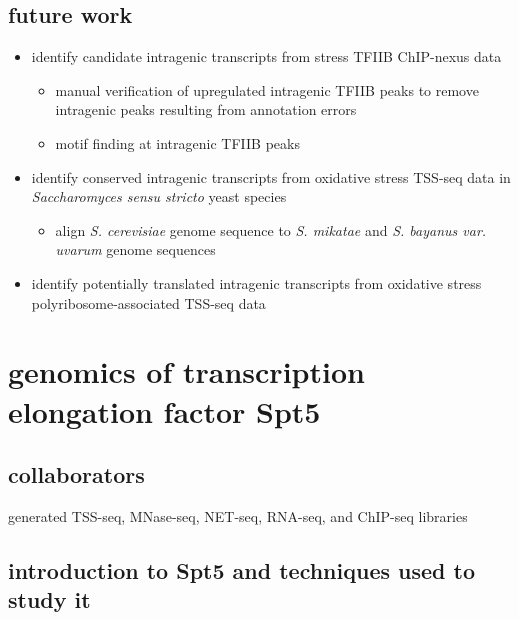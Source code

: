 \documentclass[9pt, letterpaper]{article}
\begin{document}
\subsection{future work}

\begin{itemize}[nosep]
    \item identify candidate intragenic transcripts from stress TFIIB ChIP-nexus data
        \begin{itemize}[nosep]
            \item manual verification of upregulated intragenic TFIIB peaks to remove intragenic peaks resulting from annotation errors
            \item motif finding at intragenic TFIIB peaks
        \end{itemize}
    \item identify conserved intragenic transcripts from oxidative stress TSS-seq data in \textit{Saccharomyces sensu stricto} yeast species
        \begin{itemize}[nosep]
            \item align \textit{S. cerevisiae} genome sequence to \textit{S. mikatae} and \textit{S. bayanus var. uvarum} genome sequences
        \end{itemize}
    \item identify potentially translated intragenic transcripts from oxidative stress polyribosome-associated TSS-seq data
\end{itemize}

\newpage
\section{genomics of transcription elongation factor Spt5}

\subsection{collaborators}

\begin{description}[align=right, labelwidth=5cm, noitemsep]
    \item [Ameet Shetty] generated TSS-seq, MNase-seq, NET-seq, RNA-seq, and ChIP-seq libraries
\end{description}

\subsection{introduction to Spt5 and techniques used to study it}
\end{document}
